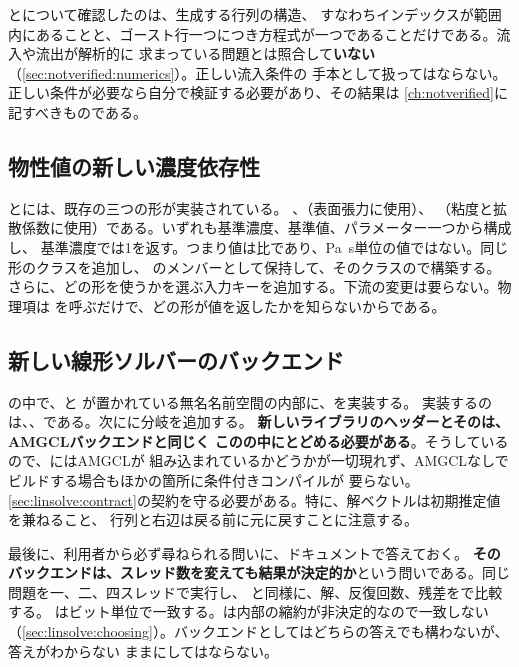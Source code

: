 \begin{warn}[既存の条件のうち二つは構造しか検証していない]
  とについて確認したのは、生成する行列の構造、
  すなわちインデックスが範囲内にあることと、ゴースト行一つにつき方程式が一つであることだけである。流入や流出が解析的に
  求まっている問題とは照合して\textbf{いない}（\cref{sec:notverified:numerics}）。正しい流入条件の
  手本として扱ってはならない。正しい条件が必要なら自分で検証する必要があり、その結果は
  \cref{ch:notverified}に記すべきものである。
\end{warn}

\subsection{物性値の新しい濃度依存性}

とには、既存の三つの形が実装されている。
、（表面張力に使用）、
（粘度と拡散係数に使用）である。いずれも基準濃度、基準値、パラメーター一つから構成し、
基準濃度では1を返す。つまり値は比であり、\si{\pascal\second}単位の値ではない。同じ形のクラスを追加し、
のメンバーとして保持して、そのクラスので構築する。
さらに、どの形を使うかを選ぶ入力キーを追加する。下流の変更は要らない。物理項は
を呼ぶだけで、どの形が値を返したかを知らないからである。

\subsection{新しい線形ソルバーのバックエンド}

の中で、と
が置かれている無名名前空間の内部に、を実装する。
実装するのは、、である。次にに分岐を追加する。
\textbf{新しいライブラリのヘッダーとそのは、AMGCLバックエンドと同じく
このの中にとどめる必要がある}。そうしているので、にはAMGCLが
組み込まれているかどうかが一切現れず、AMGCLなしでビルドする場合もほかの箇所に条件付きコンパイルが
要らない。\cref{sec:linsolve:contract}の契約を守る必要がある。特に、解ベクトルは初期推定値を兼ねること、
行列と右辺は戻る前に元に戻すことに注意する。

最後に、利用者から必ず尋ねられる問いに、ドキュメントで答えておく。
\textbf{そのバックエンドは、スレッド数を変えても結果が決定的か}という問いである。同じ問題を一、二、四スレッドで実行し、
と同様に、解、反復回数、残差を\code{==}で比較する。
はビット単位で一致する。は内部の縮約が非決定的なので一致しない
（\cref{sec:linsolve:choosing}）。バックエンドとしてはどちらの答えでも構わないが、答えがわからない
ままにしてはならない。

